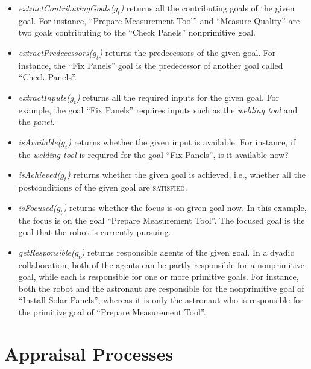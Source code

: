 \begin{itemize}[leftmargin=2pt]
  \item \textit{extractContributingGoals($g_t$)} returns all the contributing
  goals of the given goal. For instance, ``Prepare Measurement Tool'' and
  ``Measure Quality'' are two goals contributing to the ``Check Panels''
  nonprimitive goal.
  
  \item \textit{extractPredecessors($g_t$)} returns the predecessors of the
  given goal. For instance, the ``Fix Panels'' goal is the predecessor of
  another goal called ``Check Panels''.
  
  \item \textit{extractInputs($g_t$)} returns all the required inputs for
  the given goal. For example, the goal ``Fix Panels'' requires inputs such as
  the \textit{welding tool} and the \textit{panel}.
  
  \item \textit{isAvailable($g_t$)} returns whether the given input is
  available. For instance, if the \textit{welding tool} is required for the goal
  ``Fix Panels'', is it available now?
  
  \item \textit{isAchieved($g_t$)} returns whether the given goal is achieved,
  i.e., whether all the postconditions of the given goal are \textsc{satisfied}.
  
  \item \textit{isFocused($g_t$)} returns whether the focus is on given
  goal now. In this example, the focus is on the goal ``Prepare Measurement
  Tool''. The focused goal is the goal that the robot is currently pursuing.
  
  \item \textit{getResponsible($g_t$)} returns responsible agents of the given
  goal. In a dyadic collaboration, both of the agents can be partly responsible
  for a nonprimitive goal, while each is responsible for one or more primitive
  goals. For instance, both the robot and the astronaut are responsible for the
  nonprimitive goal of ``Install Solar Panels'', whereas it is only the
  astronaut who is responsible for the primitive goal of ``Prepare Measurement
  Tool''.
\end{itemize}

\section{Appraisal Processes}
\label{sec:appraisal}

